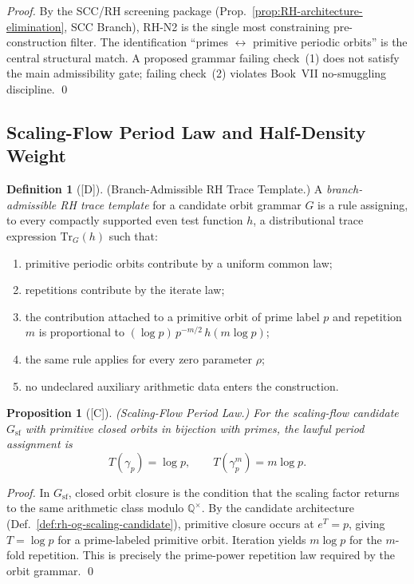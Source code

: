 \documentclass[12pt,oneside]{amsbook}
\theoremstyle{plain}
\newtheorem{proposition}[theorem]{Proposition}
\theoremstyle{definition}
\newtheorem{definition}[theorem]{Definition}
\theoremstyle{remark}
\newcommand{\status}[1]{\textup{[#1]}}
\begin{document}
\begin{proof}
By the SCC/RH screening package
(Prop.~\ref{prop:RH-architecture-elimination}, SCC Branch), RH-N2 is
the single most constraining pre-construction filter. The
identification ``primes $\leftrightarrow$ primitive periodic orbits''
is the central structural match. A proposed grammar failing check~(1)
does not satisfy the main admissibility gate; failing check~(2) violates
Book~VII no-smuggling discipline. \qed
\end{proof}

\subsection{Scaling-Flow Period Law and Half-Density Weight}

\begin{definition}[\status{D}]\label{def:rh-trace-template}
\textup{(Branch-Admissible RH Trace Template.)}
A \emph{branch-admissible RH trace template} for a candidate orbit
grammar $G$ is a rule assigning, to every compactly supported even
test function $h$, a distributional trace expression
$\mathrm{Tr}_G(h)$ such that:
\begin{enumerate}[label=\textup{(\arabic*)}]
 \item primitive periodic orbits contribute by a uniform common law;
 \item repetitions contribute by the iterate law;
 \item the contribution attached to a primitive orbit of prime label
 $p$ and repetition $m$ is proportional to
 $(\log p)\,p^{-m/2}\,h(m\log p)$;
 \item the same rule applies for every zero parameter $\rho$;
 \item no undeclared auxiliary arithmetic data enters the
 construction.
\end{enumerate}
\end{definition}

\begin{proposition}[\status{C}]\label{prop:rh-sf-period-law}
\textup{(Scaling-Flow Period Law.)}
For the scaling-flow candidate $G_{\mathrm{sf}}$ with primitive closed
orbits in bijection with primes, the lawful period assignment is
\[
 T(\gamma_p) = \log p,\qquad
 T(\gamma_p^m) = m\log p.
\]
\end{proposition}

\begin{proof}
In $G_{\mathrm{sf}}$, closed orbit closure is the condition that the
scaling factor returns to the same arithmetic class modulo
$\mathbb{Q}^\times$. By the candidate architecture
(Def.~\ref{def:rh-og-scaling-candidate}), primitive closure occurs at
$e^T = p$, giving $T = \log p$ for a prime-labeled primitive orbit.
Iteration yields $m\log p$ for the $m$-fold repetition. This is
precisely the prime-power repetition law required by the orbit grammar. \qed
\end{proof}
\end{document}
